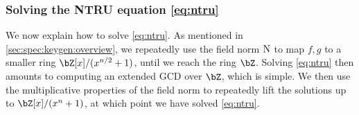  \subsubsection{Solving the NTRU equation \eqref{eq:ntru}}

 We now explain how to solve \eqref{eq:ntru}. As mentioned in \cref{sec:spec:keygen:overview}, we repeatedly use the field norm $\operatorname{N}$ to map $f,g$ to a smaller ring $\bZ[x]/(x^{n/2}+1)$, until we reach the ring $\bZ$. Solving \eqref{eq:ntru} then amounts to computing an extended GCD over $\bZ$, which is simple. We then use the multiplicative properties of the field norm to repeatedly lift the solutions up to $\bZ[x]/(x^{n}+1)$, at which point we have solved \eqref{eq:ntru}.



  \begin{algorithm}[!htp]
  \caption{$\ntrusolve_{n,q}(f, g)$\hfill}\label{alg:ntrusolve}
 \begin{algorithmic}[1]

  \label{line:botgcd}
  \label{line:botgcd2}
  \EndIf
  \Else

  \label{line:g} 
  \label{line:f}
  \EndIf
  \end{algorithmic}
 \end{algorithm}

